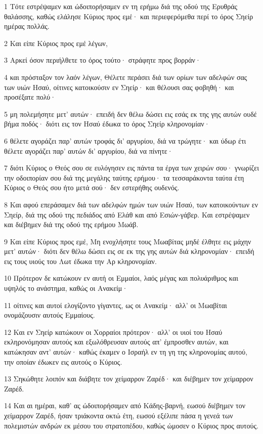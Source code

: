 \par 1 Τότε εστρέψαμεν και ώδοιπορήσαμεν εν τη ερήμω διά της οδού της Ερυθράς θαλάσσης, καθώς ελάλησε Κύριος προς εμέ· και περιεφερόμεθα περί το όρος Σηείρ ημέρας πολλάς.
\par 2 Και είπε Κύριος προς εμέ λέγων,
\par 3 Αρκεί όσον περιήλθετε το όρος τούτο· στράφητε προς βορράν·
\par 4 και πρόσταξον τον λαόν λέγων, Θέλετε περάσει διά των ορίων των αδελφών σας των υιών Ησαύ, οίτινες κατοικούσιν εν Σηείρ· και θέλουσι σας φοβηθή· και προσέξατε πολύ·
\par 5 μη πολεμήσητε μετ' αυτών· επειδή δεν θέλω δώσει εις εσάς εκ της γης αυτών ουδέ βήμα ποδός· διότι εις τον Ησαύ έδωκα το όρος Σηείρ κληρονομίαν·
\par 6 θέλετε αγοράζει παρ' αυτών τροφάς δι' αργυρίου, διά να τρώγητε· και ύδωρ έτι θέλετε αγοράζει παρ' αυτών δι' αργυρίου, διά να πίνητε·
\par 7 διότι Κύριος ο Θεός σου σε ευλόγησεν εις πάντα τα έργα των χειρών σου· γνωρίζει την οδοιπορίαν σου διά της μεγάλης ταύτης ερήμου· τα τεσσαράκοντα ταύτα έτη Κύριος ο Θεός σου ήτο μετά σού· δεν εστερήθης ουδενός.
\par 8 Και αφού επεράσαμεν διά των αδελφών ημών των υιών Ησαύ, των κατοικούντων εν Σηείρ, διά της οδού της πεδιάδος από Ελάθ και από Εσιών-γάβερ. Και εστρέψαμεν και διέβημεν διά της οδού της ερήμου Μωάβ.
\par 9 Και είπε Κύριος προς εμέ, Μη ενοχλήσητε τους Μωαβίτας μηδέ έλθητε εις μάχην μετ' αυτών· διότι δεν θέλω δώσει εις σε εκ της γης αυτών διά κληρονομίαν· επειδή εις τους υιούς του Λωτ έδωκα την Αρ κληρονομίαν.
\par 10 Πρότερον δε κατώκουν εν αυτή οι Εμμαίοι, λαός μέγας και πολυάριθμος και υψηλός το ανάστημα, καθώς οι Ανακείμ·
\par 11 οίτινες και αυτοί ελογίζοντο γίγαντες, ως οι Ανακείμ· αλλ' οι Μωαβίται ονομάζουσιν αυτούς Εμμαίους.
\par 12 Και εν Σηείρ κατώκουν οι Χορραίοι πρότερον· αλλ' οι υιοί του Ησαύ εκληρονόμησαν αυτούς και εξωλόθρευσαν αυτούς απ' έμπροσθεν αυτών, και κατώκησαν αντ' αυτών· καθώς έκαμεν ο Ισραήλ εν τη γη της κληρονομίας αυτού, την οποίαν έδωκεν εις αυτούς ο Κύριος.
\par 13 Σηκώθητε λοιπόν και διάβητε τον χείμαρρον Ζαρέδ· και διέβημεν τον χείμαρρον Ζαρέδ.
\par 14 Και αι ημέραι, καθ' ας ώδοιπορήσαμεν από Κάδης-βαρνή, εωσού διέβημεν τον χείμαρρον Ζαρέδ, ήσαν τριάκοντα οκτώ έτη, εωσού εξέλιπε πάσα η γενεά των πολεμιστών ανδρών εκ μέσου του στρατοπέδου, καθώς ώμοσεν ο Κύριος προς αυτούς.
